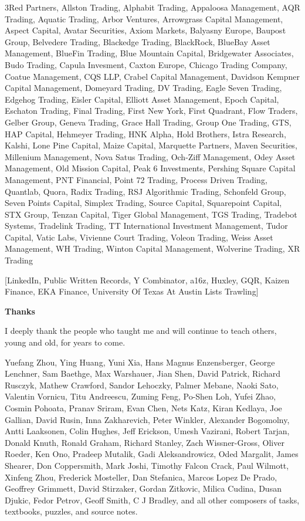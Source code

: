 3Red Partners, Allston Trading, Alphabit Trading, Appaloosa Management, AQR Trading, Aquatic Trading, Arbor Ventures, Arrowgrass Capital Management, Aspect Capital, Avatar Securities, Axiom Markets, Balyasny Europe, Baupost Group, Belvedere Trading, Blackedge Trading, BlackRock, BlueBay Asset Management, BlueFin Trading, Blue Mountain Capital, Bridgewater Associates, Budo Trading, Capula Invesment, Caxton Europe, Chicago Trading Company, Coatue Management, CQS LLP, Crabel Capital Management, Davidson Kempner Capital Management, Domeyard Trading, DV Trading, Eagle Seven Trading, Edgehog Trading, Eisler Capital, Elliott Asset Management, Epoch Capital, Eschaton Trading, Final Trading, First New York, First Quadrant, Flow Traders, Gelber Group, Geneva Trading, Grace Hall Trading, Group One Trading, GTS, HAP Capital, Hehmeyer Trading, HNK Alpha, Hold Brothers, Istra Research, Kalshi, Lone Pine Capital, Maize Capital, Marquette Partners, Maven Securities, Millenium Management, Nova Satus Trading, Och-Ziff Management, Odey Asset Management, Old Mission Capital, Peak 6 Investments, Pershing Square Capital Management, PNT Financial, Point 72 Trading, Process Driven Trading, Quantlab, Quora, Radix Trading, RSJ Algorithmic Trading, Schonfeld Group, Seven Points Capital, Simplex Trading, Source Capital, Squarepoint Capital, STX Group, Tenzan Capital, Tiger Global Management, TGS Trading, Tradebot Systems, Tradelink Trading, TT International Investment Management, Tudor Capital, Vatic Labs, Vivienne Court Trading, Voleon Trading, Weiss Asset Management, WH Trading, Winton Capital Management, Wolverine Trading, XR Trading

[LinkedIn, Public Written Records, Y Combinator, a16z, Huxley, GQR, Kaizen Finance, EKA Finance, University Of Texas At Austin Lists Trawling]



\newpage

\textbf{Thanks}

I deeply thank the people who taught me and will continue to teach others, young and old, for years to come.

Yuefang Zhou, Ying Huang, Yuni Xia, Hans Magnus Enzensberger, George Lenchner, Sam Baethge, Max Warshauer, Jian Shen, David Patrick, Richard Rusczyk, Mathew Crawford, Sandor Lehoczky, Palmer Mebane, Naoki Sato, Valentin Vornicu, Titu Andreescu, Zuming Feng, Po-Shen Loh, Yufei Zhao, Cosmin Pohoata, Pranav Sriram, Evan Chen, Nets Katz, Kiran Kedlaya, Joe Gallian, David Rusin, Inna Zakharevich, Peter Winkler, Alexander Bogomolny, Antti Laaksonen, Colin Hughes, Jeff Erickson, Umesh Vazirani, Robert Tarjan, Donald Knuth, Ronald Graham, Richard Stanley, Zach Wissner-Gross, Oliver Roeder, Ken Ono, Pradeep Mutalik, Gadi Aleksandrowicz, Oded Margalit, James Shearer, Don Coppersmith, Mark Joshi, Timothy Falcon Crack, Paul Wilmott, Xinfeng Zhou, Frederick Mosteller, Dan Stefanica, Marcos Lopez De Prado, Geoffrey Grimmett, David Stirzaker, Gordan Zitkovic, Milica Cudina, Dusan Djukic, Fedor Petrov, Geoff Smith, C J Bradley, and all other composers of tasks, textbooks, puzzles, and source notes.

